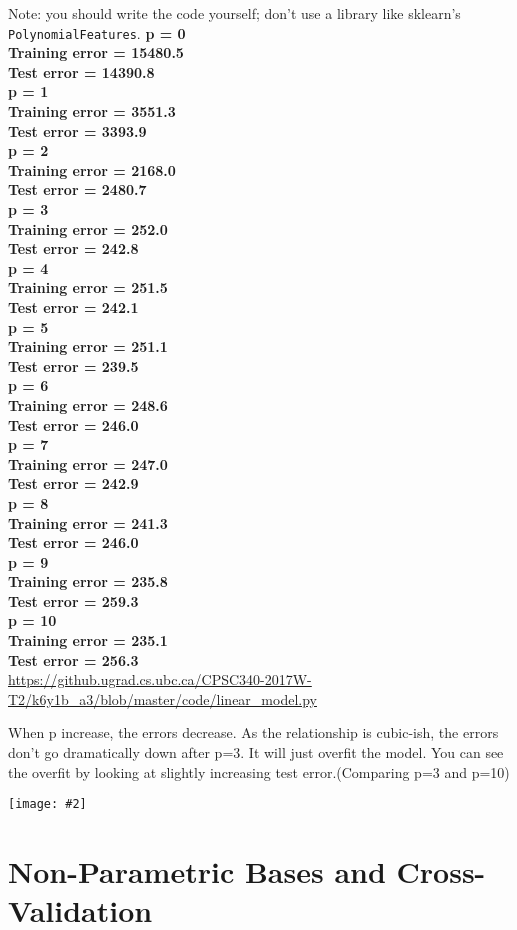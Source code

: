 \documentclass{article}
\newcommand{\centerfig}[2]{\begin{center}\texttt{[image: \#2]}\end{center}}
\begin{document}
Note: you should write the code yourself; don't use a library like sklearn's \texttt{PolynomialFeatures}.
\textbf{
p = 0\\
Training error = 15480.5\\
Test error     = 14390.8\\
p = 1\\
Training error = 3551.3\\
Test error     = 3393.9\\
p = 2\\
Training error = 2168.0\\
Test error     = 2480.7\\
p = 3\\
Training error = 252.0\\
Test error     = 242.8\\
p = 4\\
Training error = 251.5\\
Test error     = 242.1\\
p = 5\\
Training error = 251.1\\
Test error     = 239.5\\
p = 6\\
Training error = 248.6\\
Test error     = 246.0\\
p = 7\\
Training error = 247.0\\
Test error     = 242.9\\
p = 8\\
Training error = 241.3\\
Test error     = 246.0\\
p = 9\\
Training error = 235.8\\
Test error     = 259.3\\
p = 10\\
Training error = 235.1\\
Test error     = 256.3\\
}
\url{https://github.ugrad.cs.ubc.ca/CPSC340-2017W-T2/k6y1b_a3/blob/master/code/linear_model.py}

When p increase, the errors decrease. As the relationship is cubic-ish,  the errors don't go dramatically down after p=3. It will just overfit the model. You can see the overfit by looking at slightly increasing test error.(Comparing p=3 and p=10)
\centerfig{.5}{../figs/PolyBasis3.pdf}

\section{Non-Parametric Bases and Cross-Validation}
\end{document}

